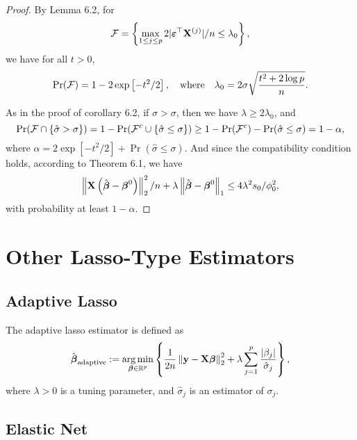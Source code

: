 \begin{proof}
	By Lemma 6.2, for
	\begin{equation*}
		\mathcal{F}=\left\{\max_{1\leq j\leq p}2|\boldsymbol{\varepsilon}^{\top}\mathbf{X}^{(j)}|/n\leq\lambda_{0}\right\},
	\end{equation*}
	we have for all \(t>0\),
	\begin{equation*}
		\Pr(\mathcal{F})=1-2\exp\left[-t^{2}/2\right],\quad\text{where}\quad\lambda_{0}=2\sigma\sqrt{\frac{t^{2}+2\log p}{n}}.
	\end{equation*}

	As in the proof of corollary 6.2, if \(\hat{\sigma}>\sigma\), then we have \(\lambda\geq 2\lambda_{0}\), and
	\begin{equation*}
		\Pr(\mathcal{F}\cap\{\hat{\sigma}>\sigma\})=1-\Pr(\mathcal{F}^{c}\cup\{\hat{\sigma}\leq\sigma\})\geq 1-\Pr(\mathcal{F}^{c})-\Pr(\hat{\sigma}\leq\sigma)=1-\alpha,
	\end{equation*}
	where \(\alpha=2\exp\left[-t^{2}/2\right]+\Pr(\hat{\sigma}\leq\sigma)\). And since the compatibility condition holds, according to Theorem 6.1, we have
	\begin{equation*}
		\left\|\mathbf{X}\left(\hat{\boldsymbol{\beta}}-\boldsymbol{\beta}^{0}\right)\right\|_{2}^{2}/n+\lambda\left\|\hat{\boldsymbol{\beta}}-\boldsymbol{\beta}^{0}\right\|_{1}\leq 4 \lambda^{2}s_{0}/\phi_{0}^{2},
	\end{equation*}
	with probability at least \(1-\alpha\).
\end{proof}

\section{Other Lasso-Type Estimators}

\subsection{Adaptive Lasso}

The adaptive lasso estimator is defined as
\begin{equation*}
	\hat{\boldsymbol{\beta}}_{\text{adaptive}}:=\underset{\boldsymbol{\beta}\in\mathbb{R}^{p}}{\arg\min}\left\{\frac{1}{2n}\left\|\mathbf{y}-\mathbf{X}\boldsymbol{\beta}\right\|_{2}^{2}+\lambda\sum_{j=1}^{p}\frac{\left|\beta_{j}\right|}{\hat{\sigma}_{j}}\right\},
\end{equation*}
where \(\lambda>0\) is a tuning parameter, and \(\hat{\sigma}_{j}\) is an estimator of \(\sigma_{j}\).

\subsection{Elastic Net}

